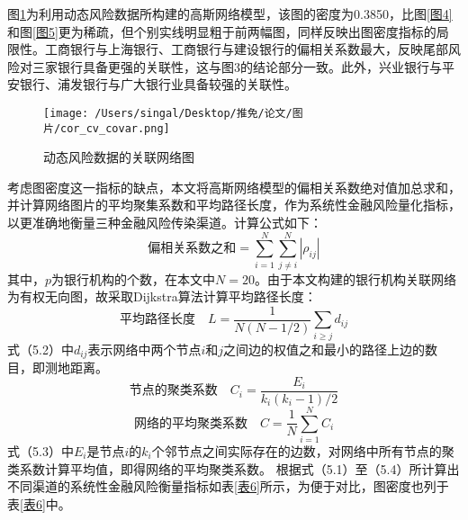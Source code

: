 \documentclass[lang=cn]{elegantpaper}
\begin{document}
图\ref{图6}为利用动态风险数据所构建的高斯网络模型，该图的密度为0.3850，比图\ref{图4}和图\ref{图5}更为稀疏，但个别实线明显粗于前两幅图，同样反映出图密度指标的局限性。工商银行与上海银行、工商银行与建设银行的偏相关系数最大，反映尾部风险对三家银行具备更强的关联性，这与图3的结论部分一致。此外，兴业银行与平安银行、浦发银行与广大银行业具备较强的关联性。
\begin{figure}[htb]
    \centering
    \texttt{[image: /Users/singal/Desktop/推免/论文/图片/cor\_cv\_covar.png]}
    \caption{动态风险数据的关联网络图}
    \label{图6}
\end{figure}

考虑图密度这一指标的缺点，本文将高斯网络模型的偏相关系数绝对值加总求和，并计算网络图片的平均聚集系数和平均路径长度，作为系统性金融风险量化指标，以更准确地衡量三种金融风险传染渠道。计算公式如下：
\begin{equation}
    \text{偏相关系数之和}=\sum_{i=1}^{N}\sum_{j\neq i}^{N} |\rho_{ij}|
\end{equation}
其中，$p$为银行机构的个数，在本文中$N=20$。由于本文构建的银行机构关联网络为有权无向图，故采取Dijkstra算法计算平均路径长度：
\begin{equation}
    \text{平均路径长度}\quad L=\frac{1}{N(N-1/2)}\sum_{i\geq j}d_{ij}
\end{equation}
式（5.2）中$d_{ij}$表示网络中两个节点$i$和$j$之间边的权值之和最小的路径上边的数目，即测地距离。
\begin{equation}
    \text{节点的聚类系数}\quad C_i=\frac{E_i}{k_i(k_i-1)/2}
\end{equation}
\begin{equation}
    \text{网络的平均聚类系数}\quad C=\frac{1}{N}\sum_{i=1}^N C_i
\end{equation}
式（5.3）中$E_i$是节点$i$的$k_i$个邻节点之间实际存在的边数，对网络中所有节点的聚类系数计算平均值，即得网络的平均聚类系数。
根据式（5.1）至（5.4）所计算出不同渠道的系统性金融风险衡量指标如表\ref{表6}所示，为便于对比，图密度也列于表\ref{表6}中。
\end{document}

